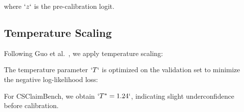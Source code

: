 where \(`z`\) is the pre-calibration logit.

\subsection{Temperature Scaling}\label{temperature-scaling}

Following Guo et al.~, we apply temperature scaling:

\begin{Shaded}
\begin{Highlighting}[]
\end{Highlighting}
\end{Shaded}

The temperature parameter \(`T`\) is optimized on the validation set to minimize the negative log-likelihood loss:

\begin{Shaded}
\begin{Highlighting}[]
\NormalTok{\textbackslash{}mathcal\{L\}\_\{\textbackslash{}mathrm\{NLL\}\}(T) = {-}\textbackslash{}sum\_\{i=1\}\^{}\{N\_\{\textbackslash{}text\{val\}\}\} \textbackslash{}Big[}
\NormalTok{\&+ (1{-}y\_i) \textbackslash{}log(1 {-} \textbackslash{}sigma(z\_i / T)) \textbackslash{}Big]}
\end{Highlighting}
\end{Shaded}

\begin{Shaded}
\begin{Highlighting}[]
\end{Highlighting}
\end{Shaded}

For CSClaimBench, we obtain \(`T^* = 1.24`\), indicating slight underconfidence before calibration.

